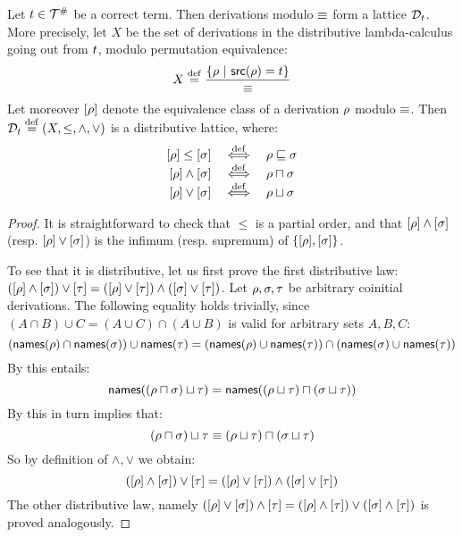\begin{theorem}
Let $t \in \mathcal{T}^{\mathtt{\#}}$ be a correct term.
Then derivations modulo $\equiv$ form a lattice $\mathcal{D}_{t}$.
More precisely, let $X$ be the set of derivations in the distributive lambda-calculus going out from $t$,
modulo permutation equivalence:
\[
  X \overset{\mathrm{def}}{=} \frac{\{\rho \ |\  \mathsf{src}(\rho) = t\}}{\equiv}
\]
Let moreover ${[\rho]}$ denote the equivalence class of a derivation $\rho$
modulo $\equiv$.
Then $\mathcal{D}_{t} \overset{\mathrm{def}}{=} (X, \leq, \land, \lor)$ is a distributive lattice, where:
\[
  \begin{array}{rcl}
  {[\rho]} \leq {[\sigma]}  & \overset{\mathrm{def}}{\iff} & \rho \sqsubseteq \sigma \\
  {[\rho]} \land {[\sigma]} & \overset{\mathrm{def}}{\iff} & \rho \sqcap \sigma \\
  {[\rho]} \lor {[\sigma]}  & \overset{\mathrm{def}}{\iff} & \rho \sqcup \sigma \\
  \end{array}
\]
\end{theorem}
\begin{proof}
It is straightforward to check that $\leq$ is a partial order,
and that ${[\rho]} \land {[\sigma]}$ (resp. ${[\rho]} \lor {[\sigma]}$)
is the infimum (resp. supremum) of $\{{[\rho]},{[\sigma]}\}$.

To see that it is distributive, let us first prove the first distributive law:
$({[\rho]} \land {[\sigma]}) \lor {[\tau]} =
({[\rho]} \lor {[\tau]}) \land ({[\sigma]} \lor {[\tau]})$.
Let $\rho,\sigma,\tau$ be arbitrary coinitial derivations.
The following equality holds trivially, since
$(A \cap B) \cup C = (A \cup C) \cap (A \cup B)$ is valid for arbitrary sets $A, B, C$:
  \[
    (\mathsf{names}(\rho) \cap \mathsf{names}(\sigma)) \cup \mathsf{names}(\tau)
    =
    (\mathsf{names}(\rho) \cup \mathsf{names}(\tau)) \cap (\mathsf{names}(\sigma) \cup \mathsf{names}(\tau))
  \]
By  this entails:
  \[
    \mathsf{names}((\rho \sqcap \sigma) \sqcup \tau)
    =
    \mathsf{names}((\rho \sqcup \tau) \sqcap (\sigma \sqcup \tau))
  \]
By  this in turn implies that:
  \[
    (\rho \sqcap \sigma) \sqcup \tau
    \equiv
    (\rho \sqcup \tau) \sqcap (\sigma \sqcup \tau)
  \]
So by definition of $\land,\lor$ we obtain:
  \[
    ({[\rho]} \land {[\sigma]}) \lor {[\tau]}
    =
    ({[\rho]} \lor {[\tau]}) \land ({[\sigma]} \lor {[\tau]})
  \]
The other distributive law, namely
$({[\rho]} \lor {[\sigma]}) \land {[\tau]} =
({[\rho]} \land {[\tau]}) \lor ({[\sigma]} \land {[\tau]})$
is proved analogously.
\end{proof}

